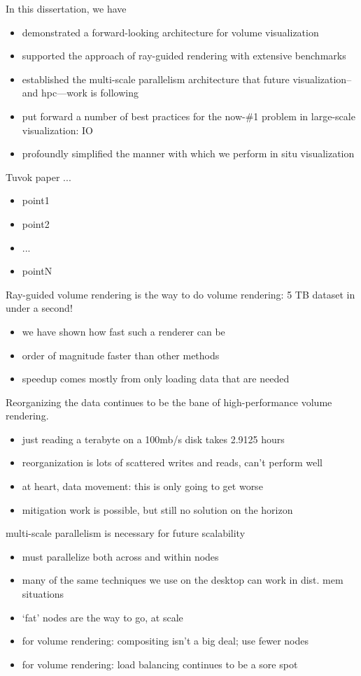 In this dissertation, we have
\begin{itemize}
	\item demonstrated a forward-looking architecture for volume visualization
	\item supported the approach of ray-guided rendering with extensive benchmarks
	\item established the multi-scale parallelism architecture that future
	visualization--and hpc---work is following
	\item put forward a number of best practices for the now-\#1 problem in
large-scale visualization: IO
	\item profoundly simplified the manner with which we perform in situ
visualization
\end{itemize}

Tuvok paper ...
\begin{itemize}
	\item point1
	\item point2
	\item ...
	\item pointN
\end{itemize}

Ray-guided volume rendering is the way to do volume rendering: 5 TB
dataset in under a second!
\begin{itemize}
	\item we have shown how fast such a renderer can be
	\item order of magnitude faster than other methods
	\item speedup comes mostly from only loading data that are needed
\end{itemize}

Reorganizing the data continues to be the bane of high-performance
volume rendering.
\begin{itemize}
	\item just reading a terabyte on a 100mb/s disk takes 2.9125 hours
	\item reorganization is lots of scattered writes and reads, can't perform well
	\item at heart, data movement: this is only going to get worse
	\item mitigation work is possible, but still no solution on the horizon
\end{itemize}

multi-scale parallelism is necessary for future scalability
\begin{itemize}
	\item must parallelize both across and within nodes
	\item many of the same techniques we use on the desktop can work in dist. mem
situations
	\item `fat' nodes are the way to go, at scale
	\item for volume rendering: compositing isn't a big deal; use fewer nodes
	\item for volume rendering: load balancing continues to be a sore spot
\end{itemize}

